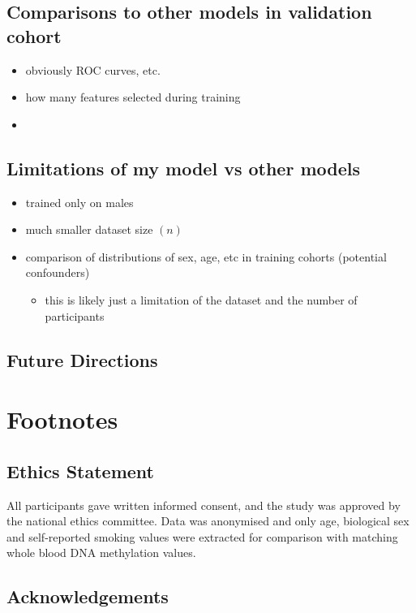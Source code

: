 \documentclass{article}
\begin{document}
\subsection*{Comparisons to other models in validation cohort}
\begin{itemize}
    \item obviously ROC curves, etc.
    \item how many features selected during training
    \item
\end{itemize}

\subsection*{Limitations of my model vs other models}
\begin{itemize}
    \item trained only on males
    \item much smaller dataset size \((n)\)
    \item comparison of distributions of sex, age, etc in training cohorts (potential confounders)
          \begin{itemize}
              \item this is likely just a limitation of the dataset and the number of participants
          \end{itemize}
\end{itemize}

\subsection*{Future Directions}

\section{Footnotes}

\subsection{Ethics Statement}
All participants gave written informed consent, and the study was approved by the national ethics committee. Data was anonymised and only age, biological sex and self-reported smoking values were extracted for comparison with matching whole blood DNA methylation values.

\subsection{Acknowledgements}

\printbibliography
\end{document}
